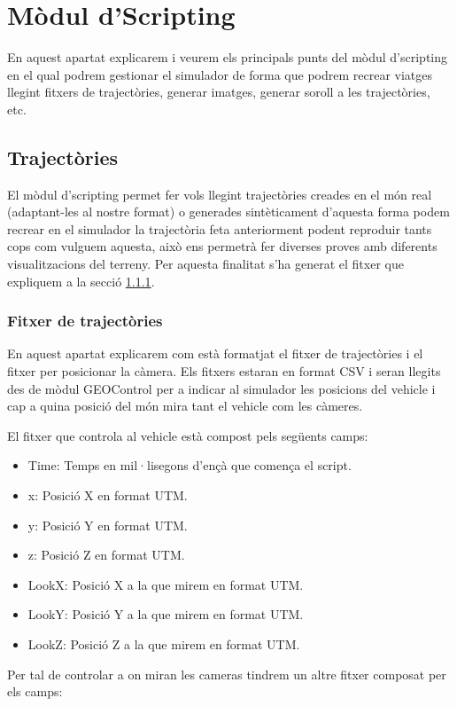 \documentclass[10pt,a4paper,twocolumn,twoside]{article}
\begin{document}
\section{Mòdul d'Scripting}
En aquest apartat explicarem i veurem els principals punts del mòdul d'scripting en el qual podrem gestionar el simulador de forma que podrem recrear viatges llegint fitxers de trajectòries, generar imatges, generar soroll a les trajectòries, etc.

\subsection{Trajectòries}
El mòdul d'scripting permet fer vols llegint trajectòries creades en el món real (adaptant-les al nostre format) o generades sintèticament d'aquesta forma podem recrear en el simulador la trajectòria feta anteriorment podent reproduir tants cops com vulguem aquesta, això ens permetrà fer diverses proves amb diferents visualitzacions del terreny. Per aquesta finalitat s'ha generat el fitxer que expliquem a la secció \ref{file-trajectories}.

\subsubsection{Fitxer de trajectòries}
\label{file-trajectories}
En aquest apartat explicarem com està formatjat el fitxer de trajectòries i el fitxer per posicionar la càmera. Els fitxers estaran en format CSV i seran llegits des de mòdul GEOControl per a indicar al simulador les posicions del vehicle i cap a quina posició del món mira tant el vehicle com les càmeres.

El fitxer que controla al vehicle està compost pels següents camps:

\begin{itemize}
\item Time: Temps en mil·lisegons d'ençà que comença el script.
\item x: Posició X en format UTM.
\item y: Posició Y en format UTM.
\item z: Posició Z en format UTM.
\item LookX: Posició X a la que mirem en format UTM.
\item LookY: Posició Y a la que mirem en format UTM.
\item LookZ: Posició Z a la que mirem en format UTM.
\end{itemize}

Per tal de controlar a on miran les cameras tindrem un altre fitxer composat per els camps:
\end{document}
